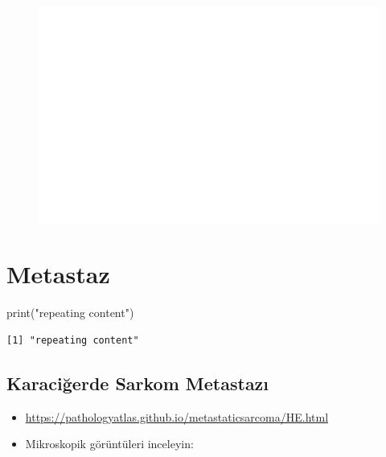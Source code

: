 \documentclass[
  letterpaper,
  DIV=11,
  numbers=noendperiod]{scrreprt}
\newenvironment{Shaded}{}{}
\newcommand{\FunctionTok}[1]{\textcolor[rgb]{0.44,0.26,0.76}{#1}}
\newcommand{\NormalTok}[1]{\textcolor[rgb]{0.14,0.16,0.18}{#1}}
\newcommand{\StringTok}[1]{\textcolor[rgb]{0.01,0.18,0.38}{#1}}
\begin{document}
\begin{figure}[H]

{\centering 

\href{https://pathologyatlas.github.io/ectopic-adrenal/HE.html}{\includegraphics{./heterotopi_files/figure-pdf/unnamed-chunk-5-1.pdf}}

}

\end{figure}

\hypertarget{metastaz}{%
\chapter{Metastaz}\label{metastaz}}

\begin{Shaded}
\begin{Highlighting}[]
\FunctionTok{print}\NormalTok{(}\StringTok{"repeating content"}\NormalTok{)}
\end{Highlighting}
\end{Shaded}

\begin{verbatim}
[1] "repeating content"
\end{verbatim}

\hypertarget{karaciux11ferde-sarkom-metastazux131}{%
\section{Karaciğerde Sarkom
Metastazı}\label{karaciux11ferde-sarkom-metastazux131}}

\begin{itemize}
\item
  \url{https://pathologyatlas.github.io/metastaticsarcoma/HE.html}
\item
  Mikroskopik görüntüleri inceleyin:
\end{itemize}
\end{document}
